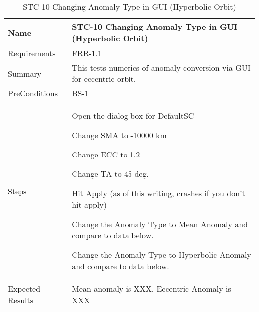 




\begin{table}[htbp!]
\centering
      \begin{tabular}{|p{1.05 in} |p{4.75 in} |}
      \hline
         \rowcolor[rgb]{0.8,0.8,0.8} Name & STC-10 Changing Anomaly Type in GUI (Hyperbolic Orbit)\\    \hline
         Requirements & FRR-1.1 \\  \hline
         Summary &
         This tests numerics of anomaly conversion via GUI for eccentric orbit.
         \\  \hline
         PreConditions & BS-1\\
         \hline
         Steps &
         \begin{compactenum}
             \item Open the dialog box for DefaultSC
             \item Change SMA to -10000 km  
             \item Change ECC to 1.2
             \item Change TA to 45 deg.
             \item Hit Apply (as of this writing, crashes if you don't hit apply)
             \item Change the Anomaly Type to Mean Anomaly and compare to data below.
             \item Change the Anomaly Type to Hyperbolic Anomaly and compare to data below.
         \end{compactenum}
         \\ \hline
         Expected Results & Mean anomaly is XXX.  Eccentric Anomaly is XXX \\ \hline
\end{tabular}
      \label{Table: STC-10}
      \caption{STC-10 Changing Anomaly Type in GUI (Hyperbolic Orbit)}
\end{table} 
